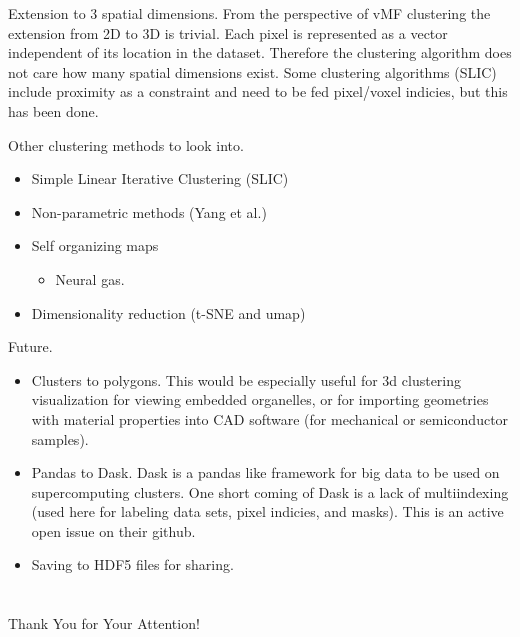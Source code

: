 \documentclass[
]{beamer}
\begin{document}
\begin{frame}{Extension to 3 spatial dimensions.}
From the perspective of vMF clustering the extension from 2D to 3D is trivial. Each pixel is represented as a vector independent of its location in the dataset. Therefore the clustering algorithm does not care how many spatial dimensions exist. Some clustering algorithms (SLIC) include proximity as a constraint and need to be fed pixel/voxel indicies, but this has been done.
\end{frame}

\begin{frame}{Other clustering methods to look into.}
\begin{itemize}
    \item Simple Linear Iterative Clustering (SLIC)
    \item Non-parametric methods (Yang et al.)
    \item Self organizing maps
    \begin{itemize}
        \item Neural gas.
    \end{itemize}
    \item Dimensionality reduction (t-SNE and umap)
\end{itemize}
\end{frame}

\begin{frame}{Future.}
\begin{itemize}
    \item Clusters to polygons. This would be especially useful for 3d clustering visualization for viewing embedded organelles, or for importing geometries with material properties into CAD software (for mechanical or semiconductor samples).
    \item Pandas to Dask. Dask is a pandas like framework for big data to be used on supercomputing clusters. One short coming of Dask is a lack of multiindexing (used here for labeling data sets, pixel indicies, and masks). This is an active open issue on their github.
    \item Saving to HDF5 files for sharing.
\end{itemize}
\end{frame}


\section{\bibname}
\begin{frame}[t, allowframebreaks]{\bibname}
\printbibliography[heading=none]
\end{frame}
\begin{frame}[plain]
\vfill
\centerline{Thank You for Your Attention!}
\vfill\vfill
\end{frame}
\end{document}
